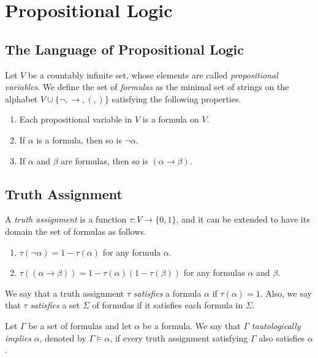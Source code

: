 \chapter{Propositional Logic}
\section{The Language of Propositional Logic}
\begin{definition}
  Let $V$ be a countably infinite set, whose elements are called
  \emph{propositional variables}.
  We define the set of \emph{formulas} as the minimal set of strings on
  the alphabet $V \cup \{\neg, \to, (, )\}$ satisfying the following
  properties.
  \begin{enumerate}
    \item Each propositional variable in $V$ is a formula on $V$.
    \item If $\alpha$ is a formula, then so is $\neg\alpha$.
    \item If $\alpha$ and $\beta$ are formulas, then so is
    $(\alpha \to \beta)$.
  \end{enumerate}
\end{definition}

\section{Truth Assignment}
\begin{definition}
  A \emph{truth assignment} is a function $\tau: V \to \{0, 1\}$, and it can be
  extended to have its domain the set of formulas as follows.
  \begin{enumerate}
    \item $\tau(\neg\alpha) = 1 - \tau(\alpha)$ for any formula $\alpha$.
    \item $\tau((\alpha \to \beta)) = 1 - \tau(\alpha)
    (1 - \tau(\beta))$ for any formulas $\alpha$ and $\beta$.
  \end{enumerate}
\end{definition}

\begin{definition}
  We say that a truth assignment $\tau$ \emph{satisfies} a formula $\alpha$
  if $\tau(\alpha) = 1$.
  Also, we say that $\tau$ \emph{satisfies} a set $\Sigma$ of formulas if it
  satisfies each formula in $\Sigma$.
\end{definition}

\begin{definition}
  Let $\Gamma$ be a set of formulas and let $\alpha$ be a formula.
  We say that $\Gamma$ \emph{tautologically implies} $\alpha$, denoted by
  $\Gamma \vDash \alpha$, if every truth assignment satisfying $\Gamma$
  also satisfies $\alpha$.
\end{definition}

